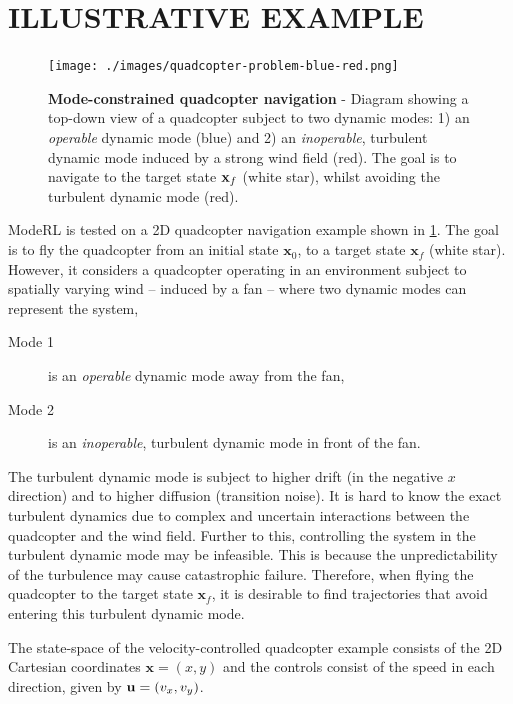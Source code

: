 \documentclass[twoside]{article}
\newcommand{\state}{\ensuremath{\mathbf{x}}}
\newcommand{\control}{\ensuremath{\mathbf{u}}}
\begin{document}
\section{ILLUSTRATIVE EXAMPLE \label{illustrative_example}}
\label{sec:org085e6aa}
\begin{figure}[!t]
    \centering
    \texttt{[image: ./images/quadcopter-problem-blue-red.png]}
    \caption{\label{fig-problem-statement} \textbf{Mode-constrained quadcopter navigation} -
    Diagram showing a top-down view of a quadcopter subject to two dynamic modes:
    1) an \textit{operable} dynamic mode (blue) and 2) an \textit{inoperable}, turbulent dynamic mode induced by a strong wind field (red).
    The goal is to navigate to the target state $\targetState$ (white star), whilst avoiding the turbulent dynamic mode (red).}
\end{figure}
ModeRL is tested on a 2D quadcopter navigation example shown in \cref{fig-problem-statement}.
The goal is to fly the quadcopter from an initial state \(\state_0\), to a target state \(\state_{f}\) (white star).
However, it considers a quadcopter operating in an environment subject to spatially varying wind --
induced by a fan -- where two dynamic modes can represent the system,
\begin{description}
\item[{Mode 1}] is an \emph{operable} dynamic mode away from the fan,
\item[{Mode 2}] is an \emph{inoperable}, turbulent dynamic mode in front of the fan.
\end{description}
The turbulent dynamic mode is subject to higher drift (in the negative \(x\) direction) and
to higher diffusion (transition noise).
It is hard to know the exact turbulent dynamics due to complex and uncertain interactions between the
quadcopter and the wind field.
Further to this, controlling the system in the turbulent dynamic mode may be infeasible.
This is because the unpredictability of the turbulence may cause catastrophic failure.
Therefore, when flying the quadcopter to the target state \(\state_{f}\),
it is desirable to find trajectories that avoid entering this turbulent dynamic mode.

The state-space of the velocity-controlled quadcopter example consists of the 2D Cartesian coordinates \(\state = (x, y)\)
and the controls consist of the speed in each direction, given by \(\control = (\velocity_x, \velocity_y)\).
\end{document}
